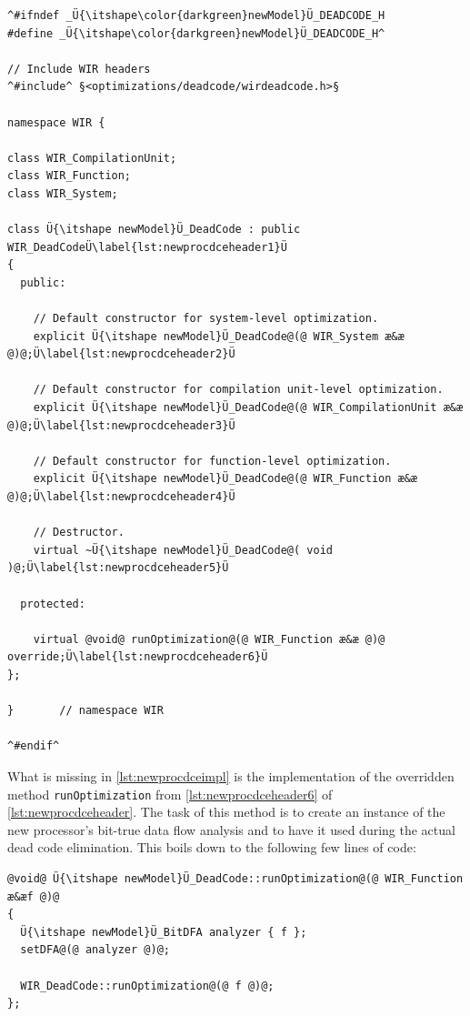 \begin{lstlisting}[style=code,float=!t,caption={Header File for a New Processor Model's Dead Code Elimination},label=lst:newprocdceheader]
^#ifndef _Ü{\itshape\color{darkgreen}newModel}Ü_DEADCODE_H
#define _Ü{\itshape\color{darkgreen}newModel}Ü_DEADCODE_H^

// Include WIR headers
^#include^ §<optimizations/deadcode/wirdeadcode.h>§

namespace WIR {

class WIR_CompilationUnit;
class WIR_Function;
class WIR_System;

class Ü{\itshape newModel}Ü_DeadCode : public WIR_DeadCodeÜ\label{lst:newprocdceheader1}Ü
{
  public:

    // Default constructor for system-level optimization.
    explicit Ü{\itshape newModel}Ü_DeadCode@(@ WIR_System æ&æ @)@;Ü\label{lst:newprocdceheader2}Ü

    // Default constructor for compilation unit-level optimization.
    explicit Ü{\itshape newModel}Ü_DeadCode@(@ WIR_CompilationUnit æ&æ @)@;Ü\label{lst:newprocdceheader3}Ü

    // Default constructor for function-level optimization.
    explicit Ü{\itshape newModel}Ü_DeadCode@(@ WIR_Function æ&æ @)@;Ü\label{lst:newprocdceheader4}Ü

    // Destructor.
    virtual ~Ü{\itshape newModel}Ü_DeadCode@( void )@;Ü\label{lst:newprocdceheader5}Ü

  protected:

    virtual @void@ runOptimization@(@ WIR_Function æ&æ @)@ override;Ü\label{lst:newprocdceheader6}Ü
};

}       // namespace WIR

^#endif^
\end{lstlisting}

What is missing in \cref{lst:newprocdceimpl} is the implementation of the overridden method \texttt{runOptimization} from \cref{lst:newprocdceheader6} of \cref{lst:newprocdceheader}.
The task of this method is to create an instance of the new processor's bit-true data flow analysis and to have it used during the actual dead code elimination.
This boils down to the following few lines of code: \\
\begin{lstlisting}[style=code,float=!ht,belowskip=-0.8 \baselineskip]
@void@ Ü{\itshape newModel}Ü_DeadCode::runOptimization@(@ WIR_Function æ&æf @)@
{
  Ü{\itshape newModel}Ü_BitDFA analyzer { f };
  setDFA@(@ analyzer @)@;

  WIR_DeadCode::runOptimization@(@ f @)@;
};
\end{lstlisting}

